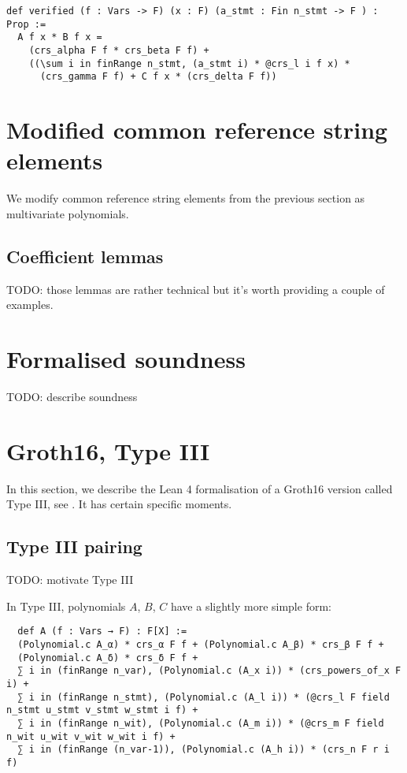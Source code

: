 \documentclass{article}
\theoremstyle{definition}
\theoremstyle{remark}
\begin{document}
\begin{lstlisting}
def verified (f : Vars -> F) (x : F) (a_stmt : Fin n_stmt -> F ) : Prop :=
  A f x * B f x =
    (crs_alpha F f * crs_beta F f) +
    ((\sum i in finRange n_stmt, (a_stmt i) * @crs_l i f x) *
      (crs_gamma F f) + C f x * (crs_delta F f))
\end{lstlisting}

\section{Modified common reference string elements}

We modify common reference string elements from the previous section as multivariate polynomials.

\subsection{Coefficient lemmas}

TODO: those lemmas are rather technical but it's worth providing a couple of examples.

\section{Formalised soundness}

TODO: describe soundness

\section{Groth16, Type III}

In this section, we describe the Lean 4 formalisation of a Groth16 version called Type III, see \cite{baghery2021another}. It has certain specific moments.

\subsection{Type III pairing}

TODO: motivate Type III

In Type III, polynomials $A$, $B$, $C$ have a slightly more simple form:
\begin{lstlisting}
  def A (f : Vars → F) : F[X] :=
  (Polynomial.c A_α) * crs_α F f + (Polynomial.c A_β) * crs_β F f +
  (Polynomial.c A_δ) * crs_δ F f +
  ∑ i in (finRange n_var), (Polynomial.c (A_x i)) * (crs_powers_of_x F i) +
  ∑ i in (finRange n_stmt), (Polynomial.c (A_l i)) * (@crs_l F field n_stmt u_stmt v_stmt w_stmt i f) +
  ∑ i in (finRange n_wit), (Polynomial.c (A_m i)) * (@crs_m F field n_wit u_wit v_wit w_wit i f) +
  ∑ i in (finRange (n_var-1)), (Polynomial.c (A_h i)) * (crs_n F r i f)
\end{lstlisting}
\end{document}
